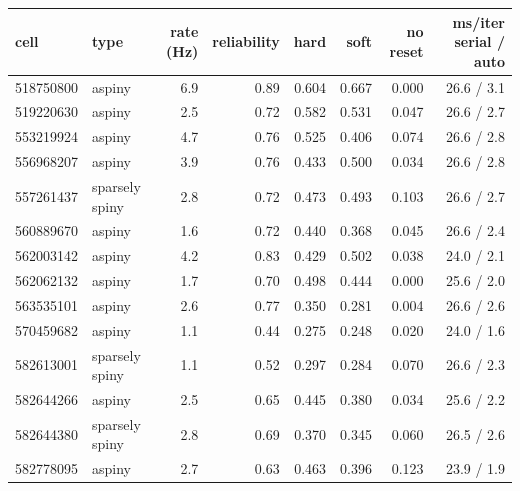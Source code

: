 \begin{tabular}{llrrrrrr}
\toprule
cell & type & rate (Hz) & reliability & hard & soft & no reset & ms/iter serial / auto\\
\midrule
518750800 & aspiny & 6.9 & 0.89 & 0.604 & 0.667 & 0.000 & 26.6 / 3.1\\
519220630 & aspiny & 2.5 & 0.72 & 0.582 & 0.531 & 0.047 & 26.6 / 2.7\\
553219924 & aspiny & 4.7 & 0.76 & 0.525 & 0.406 & 0.074 & 26.6 / 2.8\\
556968207 & aspiny & 3.9 & 0.76 & 0.433 & 0.500 & 0.034 & 26.6 / 2.8\\
557261437 & sparsely spiny & 2.8 & 0.72 & 0.473 & 0.493 & 0.103 & 26.6 / 2.7\\
560889670 & aspiny & 1.6 & 0.72 & 0.440 & 0.368 & 0.045 & 26.6 / 2.4\\
562003142 & aspiny & 4.2 & 0.83 & 0.429 & 0.502 & 0.038 & 24.0 / 2.1\\
562062132 & aspiny & 1.7 & 0.70 & 0.498 & 0.444 & 0.000 & 25.6 / 2.0\\
563535101 & aspiny & 2.6 & 0.77 & 0.350 & 0.281 & 0.004 & 26.6 / 2.6\\
570459682 & aspiny & 1.1 & 0.44 & 0.275 & 0.248 & 0.020 & 24.0 / 1.6\\
582613001 & sparsely spiny & 1.1 & 0.52 & 0.297 & 0.284 & 0.070 & 26.6 / 2.3\\
582644266 & aspiny & 2.5 & 0.65 & 0.445 & 0.380 & 0.034 & 25.6 / 2.2\\
582644380 & sparsely spiny & 2.8 & 0.69 & 0.370 & 0.345 & 0.060 & 26.5 / 2.6\\
582778095 & aspiny & 2.7 & 0.63 & 0.463 & 0.396 & 0.123 & 23.9 / 1.9\\
\bottomrule
\end{tabular}
